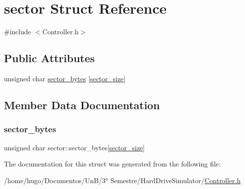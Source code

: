 \hypertarget{structsector}{}\section{sector Struct Reference}
\label{structsector}


{\ttfamily \#include $<$Controller.\+h$>$}

\subsection*{Public Attributes}
\begin{DoxyCompactItemize}
\item 
unsigned char \hyperlink{structsector_a27144935035a1ca3d835b64828397be2}{sector\+\_\+bytes} \mbox{[}\hyperlink{Controller_8h_a1b18f4b960b1edf77fa6c4f9c668d1f9}{sector\+\_\+size}\mbox{]}
\end{DoxyCompactItemize}


\subsection{Member Data Documentation}
\mbox{\label{structsector_a27144935035a1ca3d835b64828397be2}} 
\subsubsection{\texorpdfstring{sector\+\_\+bytes}{sector\_bytes}}
{\footnotesize\ttfamily unsigned char sector\+::sector\+\_\+bytes\mbox{[}\hyperlink{Controller_8h_a1b18f4b960b1edf77fa6c4f9c668d1f9}{sector\+\_\+size}\mbox{]}}



The documentation for this struct was generated from the following file\+:\begin{DoxyCompactItemize}
\item 
/home/hugo/\+Documentos/\+Un\+B/3° Semestre/\+Hard\+Drive\+Simulator/\hyperlink{Controller_8h}{Controller.\+h}\end{DoxyCompactItemize}
